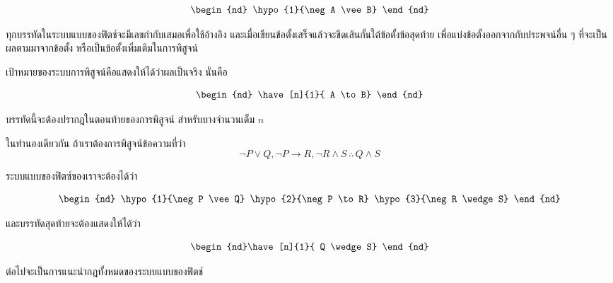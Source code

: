 \documentclass[a4paper,12pt]{extbook}
\theoremstyle{definition}
\theoremstyle{remark}
\newcommand{\fitch}[1]{
	
\begin{minipage}[l]{0.5in}%
		\begin{equation*}%
		\begin{nd}%
		#1	%
		\end{nd}%
		\end{equation*}%
		\vspace{0pt}%
\end{minipage}%

}
\begin{document}
	\begin{minipage}[l]{0.5in}
		\begin{equation*}
			\begin{nd}
				\hypo{1}{\neg A \vee B}	
			\end{nd}
		\end{equation*}%
		\vspace{0pt}
	\end{minipage}

	ทุกบรรทัดในระบบแบบของฟิตช์จะมีเลขกำกับเสมอเพื่อใช้อ้างอิง และเมื่อเขียนข้อตั้งเสร็จแล้วจะขีดเส้นกั้นใต้ข้อตั้งข้อสุดท้าย เพื่อแบ่งข้อตั้งออกจากกับประพจน์อื่น ๆ ที่จะเป็นผลตามมาจากข้อตั้ง หรือเป็นข้อตั้งเพิ่มเติมในการพิสูจน์
	
	เป้าหมายของระบบการพิสูจน์คือแสดงให้ได้ว่าผลเป็นจริง นั่นคือ 

	\begin{minipage}[l]{0.5in}
		\begin{equation*}
			\begin{nd}
				\have[n]{1}{ A \to B}	
			\end{nd}
		\end{equation*}%
		\vspace{0pt}
	\end{minipage}

	บรรทัดนี้จะต้องปรากฎในตอนท้ายของการพิสูจน์ สำหรับบางจำนวนเต็ม $n$ 
	
	ในทำนองเดียวกัน ถ้าเราต้องการพิสูจน์ข้อความที่ว่า
	\begin{equation*}
		\neg P \vee Q,\neg P \to R,\neg R \wedge S\,\therefore\, Q \wedge S
	\end{equation*}

	
	ระบบแบบของฟิตซ์ของเราจะต้องได้ว่า\nopagebreak
	\fitch{
		\hypo{1}{\neg P \vee Q}
		\hypo{2}{\neg P \to R}
		\hypo{3}{\neg R \wedge S}
		}

	และบรรทัดสุดท้ายจะต้องแสดงให้ได้ว่า
	\fitch{\have[n]{1}{	Q \wedge S}}
	ต่อไปจะเป็นการแนะนำกฎทั้งหมดของระบบแบบของฟิตช์
\end{document}

